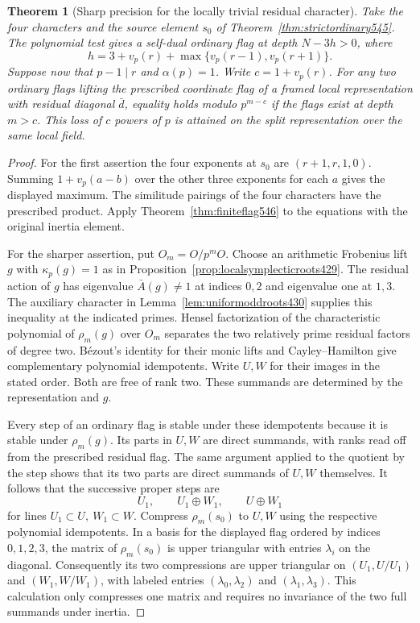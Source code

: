 \documentclass[a4paper,11pt]{article}
\newtheorem{theorem}[proposition]{Theorem}
\theoremstyle{definition}
\theoremstyle{remark}
\numberwithin{equation}{section}
\begin{document}
\begin{theorem}[Sharp precision for the locally trivial residual character]
\leavevmode\label{thm:doubleflag546}
Take the four characters and the source element \(s_0\) of
Theorem~\ref{thm:strictordinary545}. The polynomial test
gives a self-dual ordinary flag at depth \(N-3h>0\), where
\[
       h=3+v_p(r)+\max\{v_p(r-1),v_p(r+1)\}.
\]
Suppose now that \(p-1\mid r\) and \(\alpha(p)=1\).
Write \(c=1+v_p(r)\). For any two ordinary flags lifting
the prescribed coordinate flag of a framed local representation
with residual diagonal \(\bar d\), equality holds modulo
\(p^{m-c}\) if the flags exist at depth \(m>c\). This loss
of \(c\) powers of \(p\) is attained on the split
representation over the same local field.
\end{theorem}
\begin{proof}
For the first assertion the four exponents at \(s_0\) are
\((r+1,r,1,0)\). Summing \(1+v_p(a-b)\) over the other
three exponents for each \(a\) gives the displayed maximum.
The similitude pairings of the four characters have the
prescribed product. Apply Theorem~\ref{thm:finiteflag546} to
the equations with the original inertia element.

For the sharper assertion, put \(O_m=O/p^mO\). Choose
an arithmetic Frobenius lift \(g\) with \(\kappa_p(g)=1\)
as in Proposition~\ref{prop:localsymplecticroots429}.
The residual action of \(g\) has eigenvalue \(\bar A(g)\ne1\)
at indices \(0,2\) and eigenvalue one at \(1,3\). The
auxiliary character in Lemma~\ref{lem:uniformoddroots430}
supplies this inequality at the indicated primes. Hensel
factorization of the characteristic polynomial of \(\rho_m(g)\)
over \(O_m\) separates the two relatively prime residual
factors of degree two. Bézout's identity for their monic
lifts and Cayley--Hamilton give complementary polynomial
idempotents. Write \(U,W\) for their images in the stated
order. Both are free of rank two. These summands are determined
by the representation and \(g\).

Every step of an ordinary flag is stable under these
idempotents because it is stable under \(\rho_m(g)\).
Its parts in \(U,W\) are direct summands, with ranks read
off from the prescribed residual flag. The same argument
applied to the quotient by the step shows that its two parts
are direct summands of \(U,W\) themselves. It follows that
the successive proper steps are
\[
             U_1,\qquad U_1\oplus W_1,\qquad U\oplus W_1
\]
for lines \(U_1\subset U,\ W_1\subset W\).
Compress \(\rho_m(s_0)\) to \(U,W\) using the respective
polynomial idempotents. In a basis for the displayed flag
ordered by indices \(0,1,2,3\), the matrix of \(\rho_m(s_0)\)
is upper triangular with entries \(\lambda_i\) on the diagonal.
Consequently its two compressions are upper triangular on
\((U_1,U/U_1)\) and \((W_1,W/W_1)\), with labeled entries
\((\lambda_0,\lambda_2)\) and \((\lambda_1,\lambda_3)\).
This calculation only compresses one matrix and requires no
invariance of the two full summands under inertia.


\end{proof}
\end{document}
